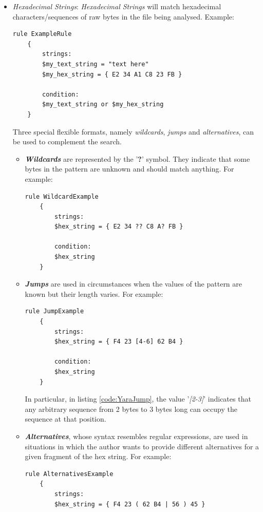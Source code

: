 \documentclass[pdfa%
,cucitura%
]{toptesi}
\begin{document}
\begin{itemize}
	\item \textit{Hexadecimal Strings}: \textit{Hexadecimal Strings} will match hexadecimal characters/sequences of raw bytes in the file being analysed.
	Example:
	\begin{lstlisting}[caption={YARA Hexadecimal}, label=code:YaraHex, language=YARA, style=mystyle]
	rule ExampleRule
	{
		strings:
		$my_text_string = "text here"
		$my_hex_string = { E2 34 A1 C8 23 FB }
		
		condition:
		$my_text_string or $my_hex_string
	}
	\end{lstlisting}
	
	
	Three special flexible formats, namely \textit{wildcards}, \textit{jumps} and \textit{alternatives}, can be used to complement the search.
	\begin{itemize}
		\item \textit{\textbf{Wildcards}} are represented by the '\textbf{?}' symbol. They indicate that some bytes in the pattern are unknown and should match anything. For example:
		\begin{lstlisting}[caption={YARA Hexadecimal Wildcard}, label=code:YaraWildcard, language=YARA, style=mystyle]
	rule WildcardExample
	{
		strings:
		$hex_string = { E2 34 ?? C8 A? FB }
		
		condition:
		$hex_string
	}
		\end{lstlisting}
		
		\item \textit{\textbf{Jumps}} are used in circumstances when the values of the pattern are known but their length varies. For example:
		\begin{lstlisting}[caption={YARA Hexadecimal Jump}, label=code:YaraJump, language=YARA, style=mystyle]
	rule JumpExample
	{
		strings:
		$hex_string = { F4 23 [4-6] 62 B4 }
		
		condition:
		$hex_string
	}
		\end{lstlisting}
		In particular, in listing \ref{code:YaraJump}, the value '\textit{[2-3]}' indicates that any arbitrary sequence from 2 bytes to 3 bytes long can occupy the sequence at that position.
		
		\item \textit{\textbf{Alternatives}}, whose syntax resembles regular expressions, are used in situations in which the author wants to provide different alternatives for a given fragment of the hex string. For example:
		\begin{lstlisting}[caption={YARA Hexadecimal Alternatives}, label=code:YaraAlternatives, language=YARA, style=mystyle]
	rule AlternativesExample
	{
		strings:
		$hex_string = { F4 23 ( 62 B4 | 56 ) 45 }
		

\end{lstlisting}
\end{itemize}
\end{itemize}
\end{document}
